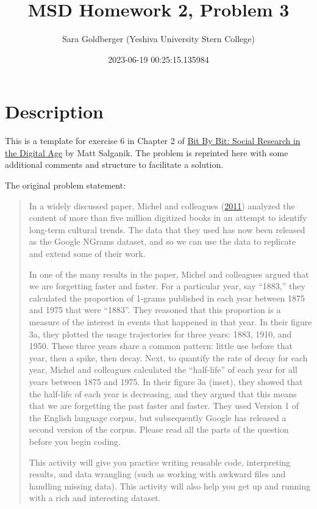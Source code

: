 \documentclass[
]{article}
\title{MSD Homework 2, Problem 3}
\author{Sara Goldberger (Yeshiva University Stern College)}
\date{2023-06-19 00:25:15.135984}
\begin{document}
\maketitle

{
\setcounter{tocdepth}{3}
\tableofcontents
}
\hypertarget{description}{%
\section{Description}\label{description}}

This is a template for exercise 6 in Chapter 2 of
\href{https://www.bitbybitbook.com/en/1st-ed/observing-behavior/observing-activities/}{Bit
By Bit: Social Research in the Digital Age} by Matt Salganik. The
problem is reprinted here with some additional comments and structure to
facilitate a solution.

The original problem statement:

\begin{quote}
In a widely discussed paper, Michel and colleagues
(\href{https://doi.org/10.1126/science.1199644}{2011}) analyzed the
content of more than five million digitized books in an attempt to
identify long-term cultural trends. The data that they used has now been
released as the Google NGrams dataset, and so we can use the data to
replicate and extend some of their work.

In one of the many results in the paper, Michel and colleagues argued
that we are forgetting faster and faster. For a particular year, say
``1883,'' they calculated the proportion of 1-grams published in each
year between 1875 and 1975 that were ``1883''. They reasoned that this
proportion is a measure of the interest in events that happened in that
year. In their figure 3a, they plotted the usage trajectories for three
years: 1883, 1910, and 1950. These three years share a common pattern:
little use before that year, then a spike, then decay. Next, to quantify
the rate of decay for each year, Michel and colleagues calculated the
``half-life'' of each year for all years between 1875 and 1975. In their
figure 3a (inset), they showed that the half-life of each year is
decreasing, and they argued that this means that we are forgetting the
past faster and faster. They used Version 1 of the English language
corpus, but subsequently Google has released a second version of the
corpus. Please read all the parts of the question before you begin
coding.

This activity will give you practice writing reusable code, interpreting
results, and data wrangling (such as working with awkward files and
handling missing data). This activity will also help you get up and
running with a rich and interesting dataset.
\end{quote}
\end{document}
